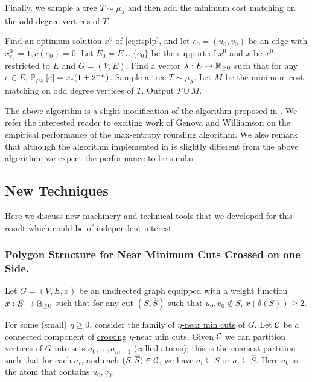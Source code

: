 Finally, we sample a tree $T\sim\mu_{\lambda}$ and then add the minimum cost matching on the odd degree vertices of $T$.
\begin{algorithm}[htb]
\begin{algorithmic}
	\State Find an optimum solution $x^0$ of  \ref{eq:tsplp}, and let $e_0=(u_0,v_0)$ be an edge with $x^0_{e_0}=1,c(e_0)=0$.
	\State Let $E_0=E\cup \{e_0\}$ be the support of $x^0$ and $x$ be $x^0$ restricted to $E$ and $G=(V,E)$.
	\State Find a vector $\lambda:E\to\mathbb{R}_{\geq 0}$ such that for any $e\in E$, ${\mathbb{P}}_{\mu_\lambda}\left[e\right]=x_e(1\pm 2^{-n})$.
	\State Sample a tree $T\sim\mu_\lambda$.
	\State Let $M$ be the minimum cost matching on odd degree vertices of $T$.
	\State Output $T \cup M$.
\end{algorithmic}
\label{alg:tsp}
\caption{An Improved Approximation Algorithm for TSP}
\end{algorithm}
The above algorithm is a slight modification of the algorithm proposed in  \cite{OSS11}. 
We refer the interested reader to exciting work of Genova and Williamson \cite{GW17} on the empirical performance of the max-entropy rounding algorithm. We also remark that although the algorithm implemented in \cite{GW17} is slightly different from the above algorithm, we expect the performance to be similar. 

\subsection{New Techniques}
Here we discuss new machinery and technical tools that we developed for this result which could be of independent interest.

\subsubsection{Polygon Structure for Near Minimum Cuts Crossed on one Side.}
Let \hyperlink{tar:G=(V,E,x)}{$G=(V,E,x)$} be an undirected graph equipped with a weight function $x:E\to\mathbb{R}_{\geq 0}$ such that for any cut $(S,\overline{S})$ such that $u_0,v_0\not\in S$, $x(\delta(S))\geq 2$.

For some (small) $\eta\geq 0$, consider the family of \hyperlink{tar:nearmincut}{$\eta$-near min cuts} of $G$. Let ${\cal C}$ be a connected component of \hyperlink{tar:crossing}{crossing} $\eta$-near min cuts. Given ${\cal C}$ we can partition vertices of $G$ into sets $a_0,\dots,a_{m-1}$ (called atoms); this is the coarsest partition such that for each $a_i$, and each $(S,\overline{S})\in {\cal C}$, we have $a_i\subseteq S$ or $a_i\subseteq \overline{S}$. 
Here $a_0$ is the atom that contains $u_0,v_0$.

